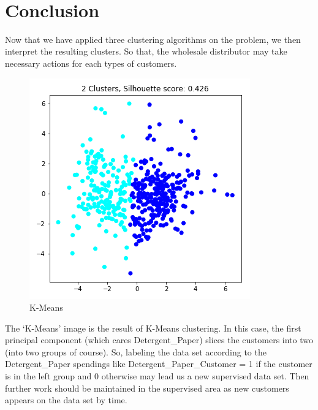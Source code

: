 \documentclass[11pt]{article}
\makeatletter
\def\maxwidth{\ifdim\Gin@nat@width>\linewidth\linewidth
    \else\Gin@nat@width\fi}
\let\Oldincludegraphics\includegraphics
\renewcommand{\includegraphics}[1]{\Oldincludegraphics[width=.8\maxwidth]{#1}}
\makeatother
\begin{document}
    \begin{center}
    \end{center}
    { \hspace*{\fill} \\}
    
    \hypertarget{conclusion}{%
\section{Conclusion}\label{conclusion}}

    Now that we have applied three clustering algorithms on the problem, we
then interpret the resulting clusters. So that, the wholesale
distributor may take necessary actions for each types of customers.

    \begin{figure}[!h]
\centering
\includegraphics{img/kmeans_fav.png}
\caption{K-Means}
\end{figure}

    The `K-Means' image is the result of K-Means clustering. In this case,
the first principal component (which cares Detergent\_Paper) slices the
customers into two (into two groups of course). So, labeling the data
set according to the Detergent\_Paper spendings like
Detergent\_Paper\_Customer = 1 if the customer is in the left group and
0 otherwise may lead us a new supervised data set. Then further work
should be maintained in the supervised area as new customers appears on
the data set by time.
\end{document}
